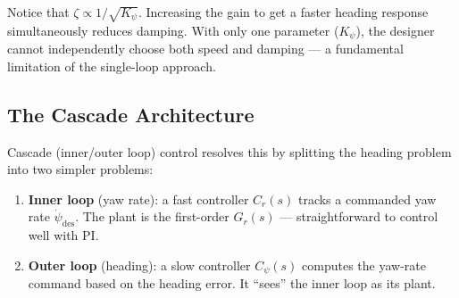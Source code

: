 \documentclass[../../book.tex]{subfiles}
\begin{document}
Notice that $\zeta \propto 1/\sqrt{K_\psi}$.  Increasing the gain to get a
faster heading response simultaneously reduces damping.  With only one
parameter ($K_\psi$), the designer cannot independently choose both speed and
damping --- a fundamental limitation of the single-loop approach.

\subsection{The Cascade Architecture}

Cascade (inner/outer loop) control resolves this by splitting the heading
problem into two simpler problems:

\begin{enumerate}
  \item \textbf{Inner loop} (yaw rate): a fast controller $C_r(s)$ tracks a
    commanded yaw rate $\dot\psi_\mathrm{des}$.  The plant is the first-order
    $G_r(s)$ --- straightforward to control well with PI.
  \item \textbf{Outer loop} (heading): a slow controller $C_\psi(s)$
    computes the yaw-rate command based on the heading error.  It ``sees''
    the inner loop as its plant.
\end{enumerate}
\end{document}
